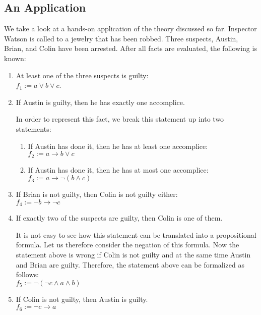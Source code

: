 \subsection{An Application}
We take a look at a hands-on application of the theory discussed so far.
 Inspector Watson is called to a jewelry that has been robbed.  Three suspects,
Austin, Brian, and Colin have been arrested.
After all facts are evaluated, the following is known:
\begin{enumerate}
\item At least one of the three suspects is guilty:
      \\[0.2cm]
      \hspace*{1.3cm} 
      $f_1 := a \vee b \vee c$.
\item If  Austin is guilty, then he has exactly one accomplice.

      In order to represent this fact, we break this statement up into two statements:
      \begin{enumerate}
      \item If Austin has done it, then he has at least one accomplice: \\[0.2cm]
            \hspace*{1.3cm} $f_2 := a \rightarrow b \vee c$ 
      \item If Austin has done it, then he has at most one accomplice: \\[0.2cm]
           \hspace*{1.3cm} $f_3 := a \rightarrow \neg (b \wedge c)$
      \end{enumerate}
\item If  Brian is not guilty, then Colin is not guilty either: \\[0.2cm]
      \hspace*{1.3cm} $f_4 :=  \neg b \rightarrow \neg c$ 
\item If exactly two of the suspects are guilty, then Colin is one of them.

      It is not easy to see how this statement can be translated into a propositional
      formula.  Let us therefore consider the negation of this formula.
      Now the statement above is wrong if  Colin is not guilty  and at the same time 
       Austin and Brian are guilty.  Therefore, the statement above can be formalized as
       follows: 
       \\[0.2cm]
      \hspace*{1.3cm} $f_5 := \neg ( \neg c  \wedge a \wedge b )$ 
\item If  Colin is not guilty, then  Austin is guilty. \\[0.2cm]
      \hspace*{1.3cm} $f_6 := \neg c \rightarrow a$
\end{enumerate}
